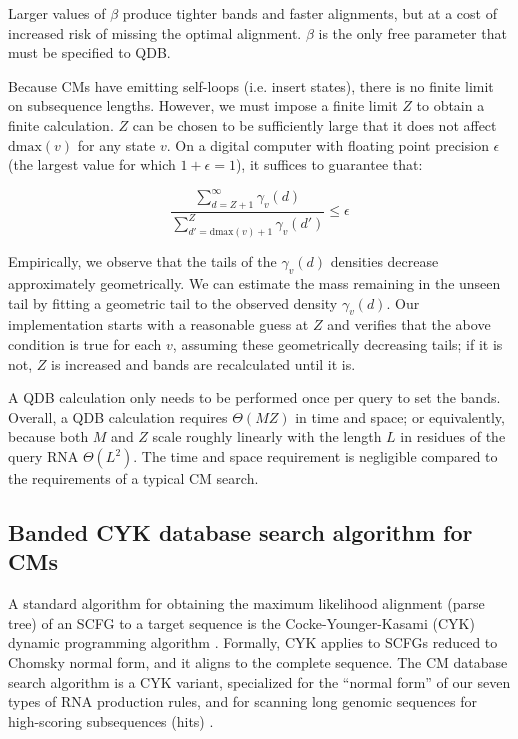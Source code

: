 \documentclass[11pt]{article}
\begin{document}
Larger values of $\beta$ produce tighter bands and faster alignments,
but at a cost of increased risk of missing the optimal
alignment. $\beta$ is the only free parameter that must be specified
to QDB.

Because CMs have emitting self-loops (i.e. insert states), there is no
finite limit on subsequence lengths. However, we must impose a finite
limit $Z$ to obtain a finite calculation.  $Z$ can be chosen to be
sufficiently large that it does not affect $\mbox{dmax}(v)$ for any
state $v$.  On a digital computer with floating point precision
$\epsilon$ (the largest value for which $1+\epsilon = 1$), it suffices
to guarantee that:

\[
  \frac{ \sum_{d = Z+1}^{\infty}  \gamma_v(d)}
       { \sum_{d' = \mbox{dmax}(v) + 1}^{Z} \gamma_v(d')}  \leq \epsilon
\]

Empirically, we observe that the tails of the $\gamma_v(d)$ densities
decrease approximately geometrically. We can estimate the mass
remaining in the unseen tail by fitting a geometric tail to the
observed density $\gamma_v(d)$. Our implementation starts with a
reasonable guess at $Z$ and verifies that the above condition is true
for each $v$, assuming these geometrically decreasing tails; if it is
not, $Z$ is increased and bands are recalculated until it is.

A QDB calculation only needs to be performed once per query to set the
bands. Overall, a QDB calculation requires $\Theta(MZ)$ in time and
space; or equivalently, because both $M$ and $Z$ scale roughly
linearly with the length $L$ in residues of the query RNA
$\Theta(L^2)$. The time and space requirement is negligible compared
to the requirements of a typical CM search.

\subsection{Banded CYK database search algorithm for CMs}

A standard algorithm for obtaining the maximum likelihood alignment
(parse tree) of an SCFG to a target sequence is the
Cocke-Younger-Kasami (CYK) dynamic programming algorithm
\cite{Kasami65,Younger67,HopcroftUllman79}. Formally, CYK applies to
SCFGs reduced to Chomsky normal form, and it aligns to the complete
sequence. The CM database search algorithm is a CYK variant,
specialized for the ``normal form'' of our seven types of RNA
production rules, and for scanning long genomic sequences for
high-scoring subsequences (hits) \cite{Durbin98}.
\end{document}
